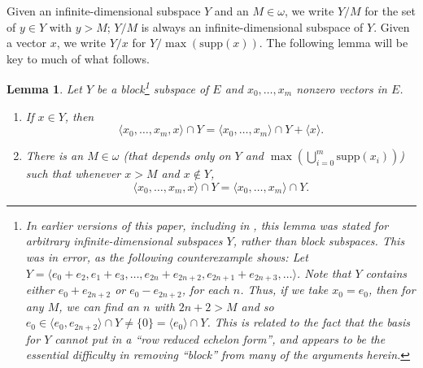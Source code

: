 \documentclass[11pt]{amsart}
\newtheorem{lemma}[thm]{Lemma}
\theoremstyle{definition}
\theoremstyle{remark}
\newcommand{\supp}{\mathrm{supp}}
\renewcommand{\1}{\mathbf{1}}
\begin{document}
Given an infinite-dimensional subspace $Y$ and an $M\in\omega$, we write $Y/M$ for the set of $y\in Y$ with $y>M$; $Y/M$ is always an infinite-dimensional subspace of $Y$. Given a vector $x$, we write $Y/x$ for $Y/\max(\supp(x))$. The following lemma will be key to much of what follows.%

\begin{lemma}\label{lem:extend}
	Let $Y$ be a block\footnote{In earlier versions of this paper, including in \cite{Smythe_thesis}, this lemma was stated for \emph{arbitrary} infinite-dimensional subspaces $Y$, rather than block subspaces. This was in error, as the following counterexample shows: Let $Y=\langle e_0+e_2,e_1+e_3,\ldots,e_{2n}+e_{2n+2},e_{2n+1}+e_{2n+3},\ldots\rangle$. Note that $Y$ contains either $e_0+e_{2n+2}$ or $e_0-e_{2n+2}$, for each $n$. Thus, if we take $x_0=e_0$, then for any $M$, we can find an $n$ with $2n+2>M$ and so $e_0\in\langle e_0,e_{2n+2}\rangle\cap Y\neq\{0\}=\langle e_0\rangle\cap Y$. This is related to the fact that the basis for $Y$ cannot put in a ``row reduced echelon form'', and appears to be the essential difficulty in removing ``block'' from many of the arguments herein.} subspace of $E$ and $x_0,\ldots,x_m$ nonzero vectors in $E$. 
	\begin{enumerate}[label=\textup{(\alph*)}]
		\item If $x\in Y$, then
		\[
			\langle x_0,\ldots,x_m,x\rangle\cap Y=\langle x_0,\ldots,x_m\rangle\cap Y+\langle x\rangle.
		\]	
		\item There is an $M\in\omega$ (that depends only on $Y$ and $\max(\bigcup_{i=0}^m\supp(x_i))$) such that whenever $x>M$ and $x\notin Y$,
		\[
			\langle x_0,\ldots,x_m,x\rangle\cap Y=\langle x_0,\ldots,x_m\rangle\cap Y.
		\]
	\end{enumerate}
\end{lemma}
\end{document}
